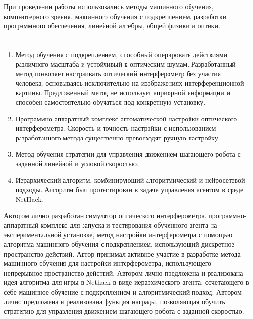 {\methods} При проведении работы использовались методы машинного обучения, компьютерного зрения, машинного обучения с подкреплением, разработки программного обеспечения, линейной алгебры, общей физики и оптики. 

\ifresume
\section*{}
\fi

{}
\begin{enumerate}[beginpenalty=10000] %
  \item Метод обучения с подкреплением, способный оперировать действиями различного масштаба и устойчивый к оптическим шумам. Разработанный метод позволяет настраивать оптический интерферометр без участия человека, основываясь исключительно на изображениях интерференционной картины. Предложенный метод не использует априорной информации и способен самостоятельно обучаться под конкретную установку.
  \item Программно-аппаратный комплекс автоматической настройки оптического интерферометра. Скорость и точность настройки с использованием разработанного метода существенно превосходят ручную настройку. 
  \item Метод обучения стратегии для управления движением шагающего робота с заданной линейной и угловой скоростью.
  \item Иерархический алгоритм, комбинирующий алгоритмический и нейросетевой подходы. Алгоритм был протестирован в задаче управления агентом в среде NetHack.
\end{enumerate}

{\contribution} Автором лично разработан симулятор оптического интерферометра, программно-аппаратный комплекс для запуска и тестирования обученного агента на экспериментальной установке, метод настройки интерферометра с помощью алгоритма машинного обучения с подкреплением, использующий дискретное пространство действий. Автор принимал активное участие в разработке метода машинного обучения для настройки интерферометра, использующего непрерывное пространство действий. Автором лично предложена и реализована идея алгоритма для игры в Nethack в виде иерархического агента, сочетающего в себе машинное обучение с подкреплением и алгоритмический подход. Автором лично предложена и реализована функция награды, позволяющая обучить стратегию для управления движением шагающего робота с заданной скоростью. 


